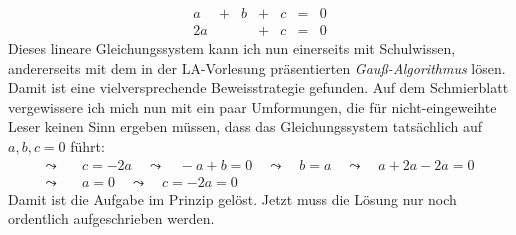 \begin{phasetwo}[Rumprobieren]
\[\begin{array}{ccccccc}
        a &+& b &+& c & =& 0 \\
        2a && &+ &c & =& 0
    \end{array}\]
    Dieses lineare Gleichungssystem kann ich nun einerseits mit Schulwissen, andererseits mit dem in der LA-Vorlesung präsentierten \emph{Gauß-Algorithmus} lösen. \\[0.5em]
    Damit ist eine vielversprechende Beweisstrategie gefunden. Auf dem Schmierblatt vergewissere ich mich nun mit ein paar Umformungen, die für nicht-eingeweihte Leser keinen Sinn ergeben müssen, dass das Gleichungssystem tatsächlich auf $a,b,c=0$ führt:
    \begingroup
    \allowdisplaybreaks
    \begin{align*}
        \leadsto\quad & c = -2a \quad\leadsto\quad -a + b = 0 \quad\leadsto\quad b = a \quad\leadsto\quad a +2a-2a = 0 \\
        \leadsto\quad & a = 0 \quad\leadsto\quad c = -2a=0
    \end{align*}
    \endgroup
    Damit ist die Aufgabe im Prinzip gelöst. Jetzt muss die Lösung nur noch ordentlich aufgeschrieben werden.
\end{phasetwo}



